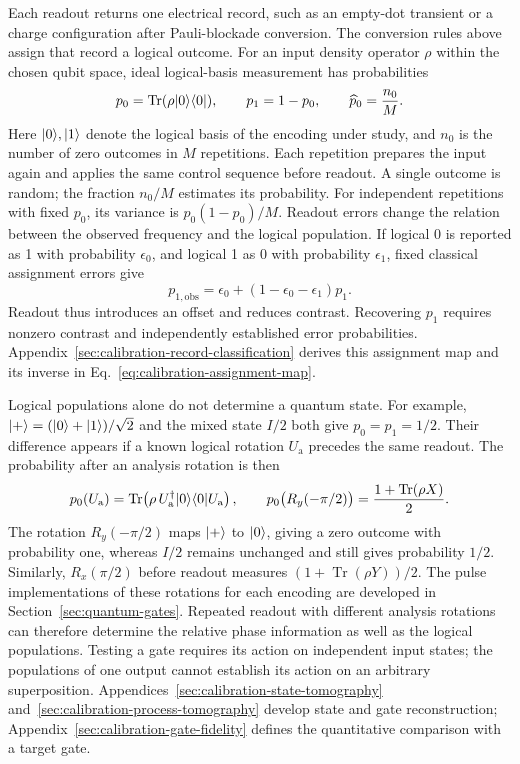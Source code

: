 Each readout returns one electrical record, such as an empty-dot
transient or a charge configuration after Pauli-blockade conversion.
The conversion rules above assign that record a logical outcome.
For an input density operator $\rho$ within the chosen qubit space,
ideal logical-basis measurement has probabilities
\begin{equation}
 p_0=\operatorname{Tr}(\rho\ket0\bra0),\qquad
 p_1=1-p_0,\qquad
 \widehat p_0=\frac{n_0}{M}.
 \label{eq:platform-repeated-readout}
\end{equation}
Here $\lvert 0\rangle,\lvert 1\rangle$ denote the logical basis of the encoding under
study, and $n_0$ is the number of zero outcomes in $M$ repetitions.
Each repetition prepares the input again and applies the same
control sequence before readout. A single outcome is random;
the fraction $n_0/M$ estimates its probability. For independent
repetitions with fixed $p_0$, its variance is $p_0(1-p_0)/M$.
Readout errors change the relation between the observed frequency
and the logical population. If logical 0 is reported as 1 with
probability $\epsilon_0$, and logical 1 as 0 with probability
$\epsilon_1$, fixed classical assignment errors give
\begin{equation}
 p_{1,\mathrm{obs}}
   =\epsilon_0+(1-\epsilon_0-\epsilon_1)p_1.
 \label{eq:platform-readout-assignment}
\end{equation}
Readout thus introduces an offset and reduces contrast. Recovering
$p_1$ requires nonzero contrast and independently established error
probabilities. Appendix~\ref{sec:calibration-record-classification}
derives this assignment map and its inverse in
Eq.~\eqref{eq:calibration-assignment-map}.

Logical populations alone do not determine a quantum state.
For example, $\lvert +\rangle= (\lvert 0\rangle+\lvert 1\rangle)/\sqrt2$ and the mixed state
$I/2$ both give $p_0=p_1=1/2$. Their difference appears if a known
logical rotation $U_{\mathrm a}$ precedes the same readout.
The probability after an analysis rotation is then
\begin{equation}
 p_0(U_{\mathrm a})
   =\operatorname{Tr}\!\left(\rho\,
            U_{\mathrm a}^\dagger\ket0\bra0 U_{\mathrm a}\right),
 \qquad
 p_0\bigl(R_y(-\pi/2)\bigr)
   =\frac{1+\operatorname{Tr}(\rho X)}2.
 \label{eq:platform-analysis-probability}
\end{equation}
The rotation $R_y(-\pi/2)$ maps $\lvert +\rangle$ to $\lvert 0\rangle$, giving a zero
outcome with probability one, whereas $I/2$ remains unchanged and
still gives probability $1/2$. Similarly, $R_x(\pi/2)$ before
readout measures $(1+\operatorname{Tr}(\rho Y))/2$.
The pulse implementations of these rotations for each encoding
are developed in Section~\ref{sec:quantum-gates}. Repeated readout with
different analysis rotations can therefore determine the relative
phase information as well as the logical populations.
Testing a gate requires its action on independent input states;
the populations of one output cannot establish its action on an
arbitrary superposition. Appendices~\ref{sec:calibration-state-tomography}
and~\ref{sec:calibration-process-tomography} develop state and gate
reconstruction; Appendix~\ref{sec:calibration-gate-fidelity}
defines the quantitative comparison with a target gate.

